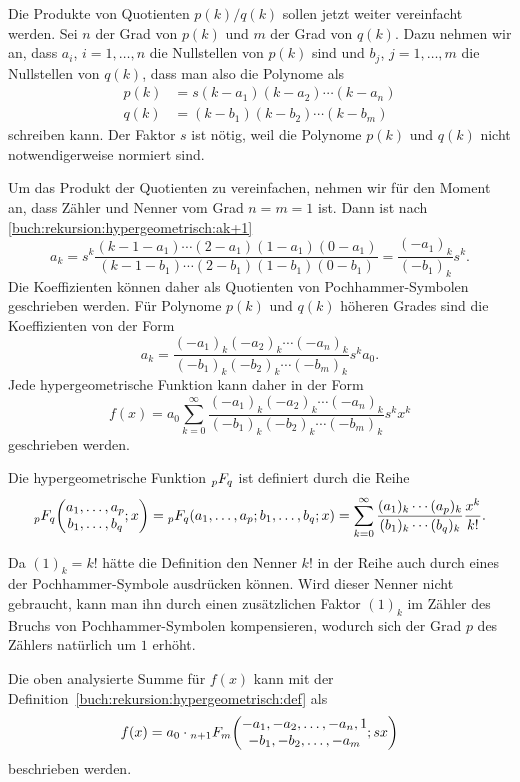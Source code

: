 Die Produkte von Quotienten $p(k)/q(k)$ sollen jetzt weiter
vereinfacht werden.
Sei $n$ der Grad von $p(k)$ und $m$ der Grad von $q(k)$.
Dazu nehmen wir an, dass $a_i$, $i=1,\dots,n$ die Nullstellen von $p(k)$ sind
und $b_j$, $j=1,\dots,m$ die Nullstellen von $q(k)$, dass man also
die Polynome als
\begin{align*}
p(k) &= s(k-a_1)(k-a_2)\cdots(k-a_n)
\\
q(k) &= (k-b_1)(k-b_2)\cdots(k-b_m)
\end{align*}
schreiben kann.
Der Faktor $s$ ist nötig, weil die Polynome $p(k)$ und $q(k)$ nicht
notwendigerweise normiert sind.

Um das Produkt der Quotienten zu vereinfachen, nehmen wir für den Moment
an, dass Zähler und Nenner vom Grad $n=m=1$ ist.
Dann ist nach 
\eqref{buch:rekursion:hypergeometrisch:ak+1}
\[
a_{k}
=
s^{k}
\frac{
(k-1-a_1) \cdots (2-a_1)(1-a_1)(0-a_1)
}{
(k-1-b_1) \cdots (2-b_1)(1-b_1)(0-b_1)
}
=
\frac{(-a_1)_k}{(-b_1)_k} s^k.
\]
Die Koeffizienten können daher als Quotienten von Pochhammer-Symbolen
geschrieben werden.
Für Polynome $p(k)$ und $q(k)$ höheren Grades sind die Koeffizienten
von der Form
\[
a_k
=
\frac{(-a_1)_k(-a_2)_k\cdots (-a_n)_k}{(-b_1)_k(-b_2)_k\cdots(-b_m)_k}
s^ka_0.
\]
Jede hypergeometrische Funktion kann daher in der Form
\[
f(x)
=
a_0
\sum_{k=0}^\infty
\frac{(-a_1)_k(-a_2)_k\cdots (-a_n)_k}{(-b_1)_k(-b_2)_k\cdots(-b_m)_k}
s^k
x^k
\]
geschrieben werden.

\begin{definition}
\label{buch:rekursion:hypergeometrisch:def}
Die hypergeometrische Funktion
$\mathstrut_pF_q$ ist definiert durch die Reihe
\[
\mathstrut_pF_q
\biggl(
\begin{matrix}
a_1,\dots,a_p\\
b_1,\dots,b_q
\end{matrix}
;
x
\biggr)
=
\mathstrut_pF_q(a_1,\dots,a_p;b_1,\dots,b_q;x)
=
\sum_{k=0}^\infty
\frac{(a_1)_k\cdots(a_p)_k}{(b_1)_k\cdots(b_q)_k}\frac{x^k}{k!}.
\]
\end{definition}

Da $(1)_k=k!$ hätte die Definition den Nenner $k!$ in der Reihe
auch durch eines der Pochhammer-Symbole ausdrücken können.
Wird dieser Nenner nicht gebraucht, kann man ihn durch einen 
zusätzlichen Faktor $(1)_k$ im Zähler des Bruchs von Pochhammer-Symbolen
kompensieren, wodurch sich der Grad $p$ des Zählers natürlich um $1$
erhöht.

Die oben analysierte Summe für $f(x)$ kann mit der
Definition~\ref{buch:rekursion:hypergeometrisch:def} als
\[
f(x)
=
a_0
\cdot
\mathstrut_{n+1}F_m \biggl(
\begin{matrix}
-a_1,-a_2,\dots,-a_n,1\\
-b_1,-b_2,\dots,-a_m
\end{matrix}; sx
\biggr)
\]
beschrieben werden.


